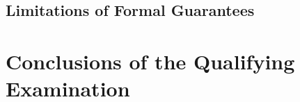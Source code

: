 \documentclass[12pt,a4paper]{report}
\begin{document}

\section{Limitations of Formal Guarantees}




\chapter{Conclusions of the Qualifying Examination}

%





\end{document}
